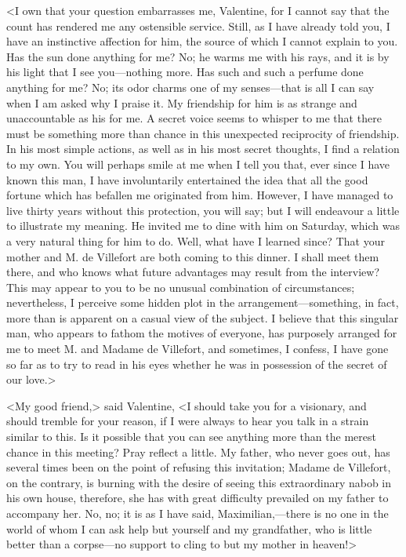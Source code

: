 <I own that your question embarrasses me, Valentine, for I cannot say that the count has rendered me any ostensible service. Still, as I have already told you, I have an instinctive affection for him, the source of which I cannot explain to you. Has the sun done anything for me? No; he warms me with his rays, and it is by his light that I see you—nothing more. Has such and such a perfume done anything for me? No; its odor charms one of my senses—that is all I can say when I am asked why I praise it. My friendship for him is as strange and unaccountable as his for me. A secret voice seems to whisper to me that there must be something more than chance in this unexpected reciprocity of friendship. In his most simple actions, as well as in his most secret thoughts, I find a relation to my own. You will perhaps smile at me when I tell you that, ever since I have known this man, I have involuntarily entertained the idea that all the good fortune which has befallen me originated from him. However, I have managed to live thirty years without this protection, you will say; but I will endeavour a little to illustrate my meaning. He invited me to dine with him on Saturday, which was a very natural thing for him to do. Well, what have I learned since? That your mother and M. de Villefort are both coming to this dinner. I shall meet them there, and who knows what future advantages may result from the interview? This may appear to you to be no unusual combination of circumstances; nevertheless, I perceive some hidden plot in the arrangement—something, in fact, more than is apparent on a casual view of the subject. I believe that this singular man, who appears to fathom the motives of everyone, has purposely arranged for me to meet M. and Madame de Villefort, and sometimes, I confess, I have gone so far as to try to read in his eyes whether he was in possession of the secret of our love.> 

 <My good friend,> said Valentine, <I should take you for a visionary, and should tremble for your reason, if I were always to hear you talk in a strain similar to this. Is it possible that you can see anything more than the merest chance in this meeting? Pray reflect a little. My father, who never goes out, has several times been on the point of refusing this invitation; Madame de Villefort, on the contrary, is burning with the desire of seeing this extraordinary nabob in his own house, therefore, she has with great difficulty prevailed on my father to accompany her. No, no; it is as I have said, Maximilian,—there is no one in the world of whom I can ask help but yourself and my grandfather, who is little better than a corpse—no support to cling to but my mother in heaven!> 

